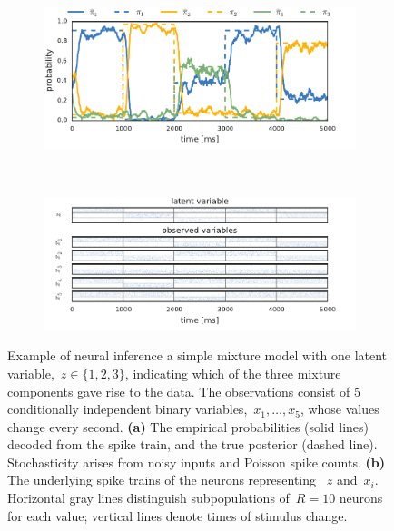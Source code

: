 \begin{figure}[t!]
  \centering
  \begin{subfigure}[b]{5.5in}
   \centering
   \caption{}
   \vspace{-.3in}
   \includegraphics[width=\textwidth]{figures/ch9/neural_mixture_probs}
   \label{fig:mixture_probs}
 \end{subfigure} \\
 \begin{subfigure}[b]{5.5in}
   \centering
   \caption{}
   \vspace{-.4in}
   \includegraphics[width=\textwidth]{figures/ch9/neural_mixture_spiketrains}
   \label{fig:mixture_spiketrains}
 \end{subfigure}
 \vspace{-.3in}
 \caption[Demo of neural inference in a simple mixture model]
         {Example of neural inference  a simple mixture model with one
           latent variable,~$z \in \{1, 2, 3\}$, indicating which of the
           three mixture components gave rise to the data. The observations
           consist of 5 conditionally independent binary
           variables,~$x_1, \ldots, x_5$, whose values change every second. 
           \textbf{(a)} The empirical probabilities (solid lines) decoded
           from the spike train, and the true posterior (dashed line).
           Stochasticity arises from noisy inputs and Poisson spike counts.
           \textbf{(b)} The underlying spike trains of the neurons representing
           ~$z$ and~$x_i$. Horizontal gray lines distinguish subpopulations of~$R=10$ neurons for
           each value; vertical lines denote times of stimulus change.
 }
 \label{fig:mixture}
\end{figure}


